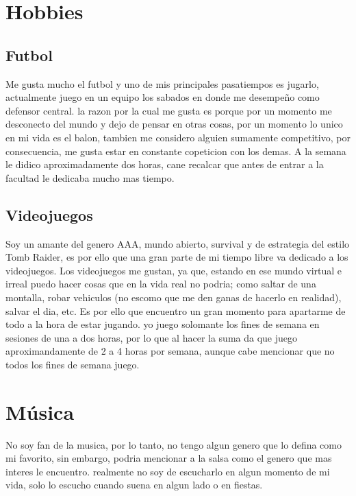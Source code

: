\documentclass[12pt]{article}
\begin{document}
\section{Hobbies}
\subsection{Futbol}
Me gusta mucho el futbol y uno de mis principales pasatiempos es jugarlo, actualmente juego en un equipo los sabados en donde me desempeño como defensor central. la razon por la cual me gusta es porque por un momento me desconecto del mundo y dejo de pensar en otras cosas, por un momento lo unico en mi vida es el balon, tambien me considero alguien sumamente competitivo, por consecuencia, me gusta estar en constante copeticion con los demas. A la semana le didico aproximadamente dos horas, cane recalcar que antes de entrar a la facultad le dedicaba mucho mas tiempo. 

\subsection{Videojuegos}
Soy un amante del genero AAA, mundo abierto, survival y de estrategia del estilo Tomb Raider, es por ello que una gran parte de mi tiempo libre va dedicado a los videojuegos. Los videojuegos me gustan, ya que, estando en ese mundo virtual e irreal puedo hacer cosas que en la vida real no podria; como saltar de una montalla, robar vehiculos (no escomo que me den ganas de hacerlo en realidad), salvar el dia, etc. Es por ello que encuentro un gran momento para apartarme de todo a la hora de estar jugando. yo juego solomante los fines de semana en sesiones de una a dos horas, por lo que al hacer la suma da que juego aproximandamente de 2 a 4 horas por semana, aunque cabe mencionar que no todos los fines de semana juego.

\section{Música}
No soy fan de la musica, por lo tanto, no tengo algun genero que lo defina como mi favorito, sin embargo, podria mencionar a la salsa como el genero que mas interes le encuentro. realmente no soy de escucharlo en algun momento de mi vida, solo lo escucho cuando suena en algun lado o en fiestas.
\end{document}
